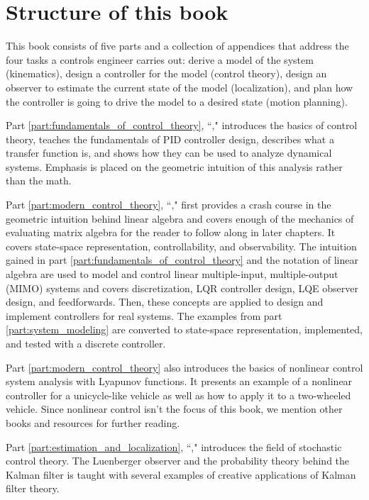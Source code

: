 \section{Structure of this book}

This book consists of five parts and a collection of appendices that address the
four tasks a controls engineer carries out: derive a model of the system
(kinematics), design a controller for the model (control theory), design an
observer to estimate the current state of the model (localization), and plan how
the controller is going to drive the model to a desired state (motion planning).

Part \ref{part:fundamentals_of_control_theory},
``," introduces the basics of
control theory, teaches the fundamentals of PID controller design, describes
what a transfer function is, and shows how they can be used to analyze dynamical
systems. Emphasis is placed on the geometric intuition of this analysis rather
than the math.

Part \ref{part:modern_control_theory}, ``,"
first provides a crash course in the geometric intuition behind linear algebra
and covers enough of the mechanics of evaluating matrix algebra for the reader
to follow along in later chapters. It covers state-space representation,
controllability, and observability. The intuition gained in part
\ref{part:fundamentals_of_control_theory} and the notation of linear algebra are
used to model and control linear multiple-input, multiple-output (MIMO) systems
and covers discretization, LQR controller design, LQE observer design, and
feedforwards. Then, these concepts are applied to design and implement
controllers for real systems. The examples from part \ref{part:system_modeling}
are converted to state-space representation, implemented, and tested with a
discrete controller.

Part \ref{part:modern_control_theory} also introduces the basics of nonlinear
control system analysis with Lyapunov functions. It presents an example of a
nonlinear controller for a unicycle-like vehicle as well as how to apply it to a
two-wheeled vehicle. Since nonlinear control isn't the focus of this book, we
mention other books and resources for further reading.

Part \ref{part:estimation_and_localization},
``," introduces the field of
stochastic control theory. The Luenberger observer and the probability theory
behind the Kalman filter is taught with several examples of creative
applications of Kalman filter theory.

